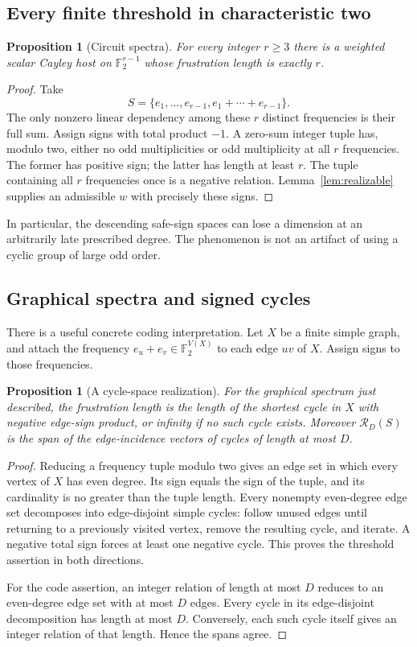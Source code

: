 \documentclass[11pt]{article}
\numberwithin{equation}{section}
\newtheorem{proposition}[theorem]{Proposition}
\theoremstyle{definition}
\theoremstyle{remark}
\newcommand{\F}{\mathbb F}
\newcommand{\Rel}{\mathcal R}
\begin{document}
\subsection{Every finite threshold in characteristic two}

\begin{proposition}[Circuit spectra]
\label{prop:circuit}
For every integer $r\geq3$ there is a weighted scalar Cayley host on
$\F_2^{r-1}$ whose frustration length is exactly $r$.
\end{proposition}
\begin{proof}
Take
\[
 S=\{e_1,\ldots,e_{r-1},e_1+\cdots+e_{r-1}\}.
\]
The only nonzero linear dependency among these $r$ distinct frequencies
is their full sum. Assign signs with total product $-1$. A zero-sum
integer tuple has, modulo two, either no odd multiplicities or odd
multiplicity at all $r$ frequencies. The former has positive sign; the
latter has length at least $r$. The tuple containing all $r$ frequencies
once is a negative relation. Lemma~\ref{lem:realizable} supplies an
admissible $w$ with precisely these signs.
\end{proof}

In particular, the descending safe-sign spaces can lose a dimension
at an arbitrarily late prescribed degree. The phenomenon is not an
artifact of using a cyclic group of large odd order.

\subsection{Graphical spectra and signed cycles}

There is a useful concrete coding interpretation. Let $X$ be a finite
simple graph, and attach the frequency $e_u+e_v\in\F_2^{V(X)}$ to each
edge $uv$ of $X$. Assign signs to those frequencies.

\begin{proposition}[A cycle-space realization]
\label{prop:graphical}
For the graphical spectrum just described, the frustration length is
the length of the shortest cycle in $X$ with negative edge-sign product,
or infinity if no such cycle exists. Moreover $\Rel_D(S)$ is the span
of the edge-incidence vectors of cycles of length at most $D$.
\end{proposition}
\begin{proof}
Reducing a frequency tuple modulo two gives an edge set in which every
vertex of $X$ has even degree. Its sign equals the sign of the tuple,
and its cardinality is no greater than the tuple length. Every nonempty
even-degree edge set decomposes into edge-disjoint simple cycles: follow
unused edges until returning to a previously visited vertex, remove the
resulting cycle, and iterate. A negative total sign forces at least one
negative cycle. This proves the threshold assertion in both directions.

For the code assertion, an integer relation of length at most $D$ reduces
to an even-degree edge set with at most $D$ edges. Every cycle in its
edge-disjoint decomposition has length at most $D$. Conversely, each
such cycle itself gives an integer relation of that length. Hence the
spans agree.
\end{proof}
\end{document}
